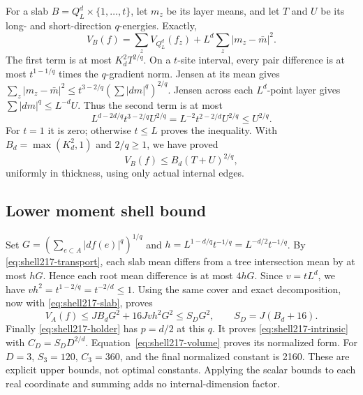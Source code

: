 For a slab $B=Q_L^d\times\{1,\ldots,t\}$, let $m_z$ be its layer means,
and let $T$ and $U$ be its long- and short-direction $q$-energies. Exactly,
\[
 V_B(f)=\sum_z V_{Q_L^d}(f_z)+L^d\sum_z|m_z-\bar m|^2.
\]
The first term is at most $K_d^2T^{2/q}$. On a $t$-site interval, every
pair difference is at most $t^{1-1/q}$ times the $q$-gradient norm.
Jensen at its mean gives
$\sum_z|m_z-\bar m|^2\leq t^{3-2/q}(\sum|dm|^q)^{2/q}$.
Jensen across each $L^d$-point layer gives $\sum|dm|^q\leq L^{-d}U$.
Thus the second term is at most
\[
 L^{d-2d/q}t^{3-2/q}U^{2/q}
 =L^{-2}t^{2-2/d}U^{2/q}\leq U^{2/q}.
\]
For $t=1$ it is zero; otherwise $t\leq L$ proves the inequality.
With $B_d=\max(K_d^2,1)$ and $2/q\geq1$, we have proved
\begin{equation}\label{eq:shell217-slab}
 V_B(f)\leq B_d(T+U)^{2/q},
\end{equation}
uniformly in thickness, using only actual internal edges.

\subsection{Lower moment shell bound}
Set $G=(\sum_{e\subset A}|df(e)|^q)^{1/q}$ and
$h=L^{1-d/q}t^{-1/q}=L^{-d/2}t^{-1/q}$.
By \eqref{eq:shell217-transport}, each slab mean differs from a tree
intersection mean by at most $hG$. Hence each root mean difference is at
most $4hG$. Since $v=tL^d$, we have $vh^2=t^{1-2/q}=t^{-2/d}\leq1$.
Using the same cover and exact decomposition, now with
\eqref{eq:shell217-slab}, proves
\[
 V_A(f)\leq JB_dG^2+16Jvh^2G^2\leq S_DG^2,
 \qquad S_D=J(B_d+16).
\]
Finally \eqref{eq:shell217-holder} has $p=d/2$ at this $q$. It proves
\eqref{eq:shell217-intrinsic} with $C_D=S_DD^{2/d}$.
Equation~\eqref{eq:shell217-volume} proves its normalized form.
For $D=3$, $S_3=120$, $C_3=360$, and the final normalized constant is 2160.
These are explicit upper bounds, not optimal constants. Applying the scalar
bounds to each real coordinate and summing adds no internal-dimension factor.

